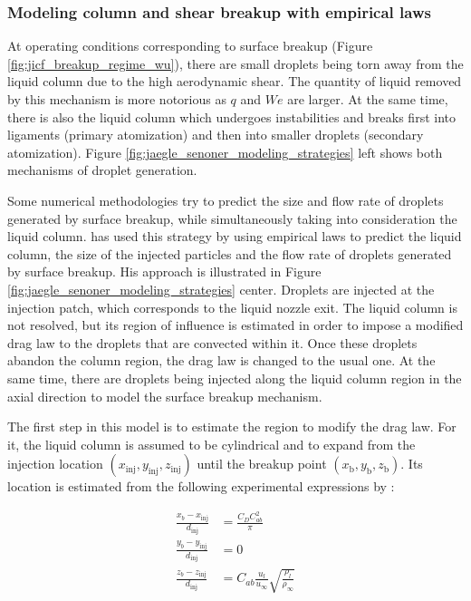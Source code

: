 \subsubsection*{Modeling column and shear breakup with empirical laws }

At operating conditions corresponding to surface breakup (Figure \ref{fig:jicf_breakup_regime_wu}), there are small droplets being torn away from the liquid column due to the high aerodynamic shear. The quantity of liquid removed by this mechanism is more notorious as $q$ and $We$ are larger. At the same time, there is also the liquid column which undergoes instabilities and breaks first into ligaments (primary atomization) and then into smaller droplets (secondary atomization). Figure \ref{fig:jaegle_senoner_modeling_strategies} left shows both mechanisms of droplet generation.

Some numerical methodologies try to predict the size and flow rate of droplets generated by surface breakup, while simultaneously taking into consideration the liquid column.  has used this strategy by using empirical laws to predict the liquid column, the size of the injected particles and the flow rate of droplets generated by surface breakup. His approach is illustrated in Figure \ref{fig:jaegle_senoner_modeling_strategies} center. Droplets are injected at the injection patch, which corresponds to the liquid nozzle exit. The liquid column is not resolved, but its region of influence is estimated in order to impose a modified drag law to the droplets that are convected within it. Once these droplets abandon the column region, the drag law is changed to the usual one. At the same time, there are droplets being injected along the liquid column region in the axial direction to model the surface breakup mechanism.

The first step in this model is to estimate the region to modify the drag law. For it, the liquid column is assumed to be cylindrical and to expand from the injection location $\left( x_\mathrm{inj}, y_\mathrm{inj}, z_\mathrm{inj} \right)$ until the breakup point $\left( x_\mathrm{b}, y_\mathrm{b}, z_\mathrm{b} \right)$. Its location is estimated from the following experimental expressions by :

\begin{subequations}
\label{eq:jaegle_breakup_point}
\begin{align}
\frac{x_b - x_\mathrm{inj}}{d_\mathrm{inj}} &= \frac{C_D C_{ab}^2}{\pi} \\
\frac{y_b - y_\mathrm{inj}}{d_\mathrm{inj}} &= 0 \\
\frac{z_b - z_\mathrm{inj}}{d_\mathrm{inj}} &= C_{ab} \frac{u_l}{u_\infty} \sqrt{\frac{\rho_l}{\rho_\infty}}
\end{align}
\end{subequations}

